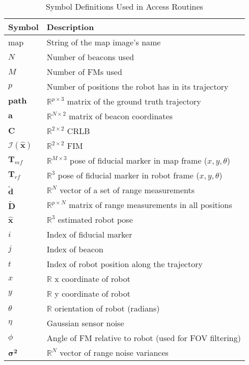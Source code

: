 \documentclass[12pt, titlepage]{article}
\begin{document}
\begin{table}[H]
  \centering
  \begin{tabular}{l l}
    \hline
    \textbf{Symbol} & \textbf{Description} \\
    \hline
    map & String of the map image's name \\
    $N$ & Number of beacons used \\
    $M$ & Number of FMs used \\
    $p$ & Number of positions the robot has in its trajectory \\
    $\mathbf{path}$ & $\mathbb{R}^{p \times 3}$ matrix of the ground truth trajectory\\
    $\mathbf{a}$ & $\mathbb{R}^{N \times 2}$ matrix of beacon coordinates \\
    $\mathbf{C}$ & $\mathbb{R}^{2 \times2}$ CRLB \\
    $\boldsymbol{\mathcal{I}}(\mathbf{\hat{x}})$ & $\mathbb{R}^{2 \times 2}$ FIM\\
    $\mathbf{T}_{mf}$ & $\mathbb{R}^{M \times 3}$ pose of fiducial marker in map frame ($x, y, \theta$) \\
    $\mathbf{T}_{rf}$ & $\mathbb{R}^3$ pose of fiducial marker in robot frame ($x, y, \theta$) \\
    $\tilde{\mathbf{d}}$ & $\mathbb{R}^N$ vector of a set of range measurements \\
    $\tilde{\mathbf{D}}$ & $\mathbb{R}^{p \times N}$ matrix of range measurements in all positions \\
    $\mathbf{\hat{x}}$ & $\mathbb{R}^3$ estimated robot pose \\
    $i$ & Index of fiducial marker \\
    $j$ & Index of beacon \\
    $t$ & Index of robot position along the trajectory \\
    $x$ & $\mathbb{R}$ x coordinate of robot \\
    $y$ & $\mathbb{R}$ y coordinate of robot \\
    $\theta$ & $\mathbb{R}$ orientation of robot (radians) \\
    $\eta$ & Gaussian sensor noise \\
    $\phi$ & Angle of FM relative to robot (used for FOV filtering) \\
    $\boldsymbol{\sigma^2}$ & $\mathbb{R}^N$ vector of range noise variances \\
    \hline
  \end{tabular}
  \caption{Symbol Definitions Used in Access Routines}
  \end{table}
  
\end{document}
